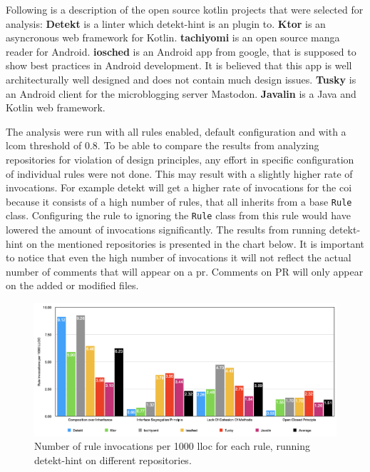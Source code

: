 \documentclass{report}
\begin{document}
Following is a description of the open source kotlin projects that were selected for analysis: \textbf{Detekt} is a linter which detekt-hint is an plugin to. \textbf{Ktor} is an asyncronous web framework for Kotlin. \textbf{tachiyomi} is an open source manga reader for Android. \textbf{iosched} is an Android app from google, that is supposed to show best practices in Android development. It is believed that this app is well architecturally well designed and does not contain much design issues. \textbf{Tusky} is an Android client for the microblogging server Mastodon. \textbf{Javalin} is a Java and Kotlin web framework. 



The analysis were run with all rules enabled, default configuration and with a \gls{lcom} threshold of 0.8. To be able to compare the results from analyzing repositories for violation of design principles, any effort in specific configuration of individual rules were not done. This may result with a slightly higher rate of invocations. For example detekt will get a higher rate of invocations for the \gls{coi} because it consists of a high number of rules, that all inherits from a base \texttt{Rule} class. Configuring the rule to ignoring the \texttt{Rule} class from this rule would have lowered the amount of invocations significantly. The results from running detekt-hint on the mentioned repositories is presented in the chart below. It is important to notice that even the high number of invocations it will not reflect the actual number of comments that will appear on a \gls{pr}. Comments on PR will only appear on the added or modified files.


\begin{figure}[h!]
    \centering
    \includegraphics[width=\linewidth]{images/distribution.png}
    \caption{Number of rule invocations per 1000 \gls{lloc} for each rule, running detekt-hint on different repositories. }
    \label{fig:distribution}
\end{figure}
\end{document}
